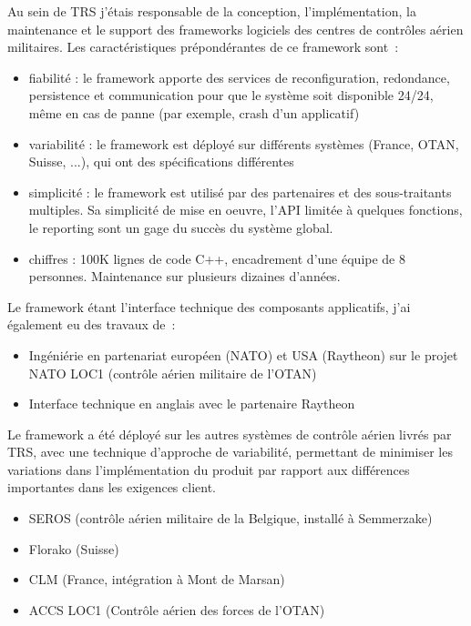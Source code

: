 {{{ %
Au sein de TRS j'étais responsable de la conception, l'implémentation, la maintenance et le support des frameworks logiciels des centres de contrôles aérien militaires. Les caractéristiques prépondérantes de ce framework sont~:
\begin{itemize}
\item{fiabilité : le framework apporte des services de reconfiguration, redondance, persistence et communication pour que le système soit disponible 24/24, même en cas de panne (par exemple, crash d'un applicatif) }
\item{variabilité : le framework est déployé sur différents systèmes (France, OTAN, Suisse, ...), qui ont des spécifications différentes}
\item{simplicité : le framework est utilisé par des partenaires et des sous-traitants multiples. Sa simplicité de mise en oeuvre, l'API limitée à quelques fonctions, le reporting sont un gage du succès du système global.}
\item{chiffres : 100K lignes de code C++, encadrement d'une équipe de 8 personnes. Maintenance sur plusieurs dizaines d'années.}
\end{itemize}
Le framework étant l'interface technique des composants applicatifs, j'ai également eu des travaux de~:
\begin{itemize}
\item {Ingéniérie en partenariat européen (NATO) et USA (Raytheon) sur le projet NATO LOC1 (contrôle aérien militaire de l'OTAN)}
\item {Interface technique en anglais avec le partenaire Raytheon}
\end{itemize}
Le framework a été déployé sur les autres systèmes de contrôle aérien livrés par TRS, avec une technique d'approche de variabilité, permettant de minimiser les variations dans l'implémentation du produit par rapport aux différences importantes dans les exigences client.
 \begin{itemize}
 \item SEROS (contrôle aérien militaire de la Belgique, installé à Semmerzake)
 \item Florako (Suisse)
 \item CLM (France, intégration à Mont de Marsan)
\item ACCS LOC1 (Contrôle aérien des forces de l'OTAN)
\end{itemize}
}
}
}

